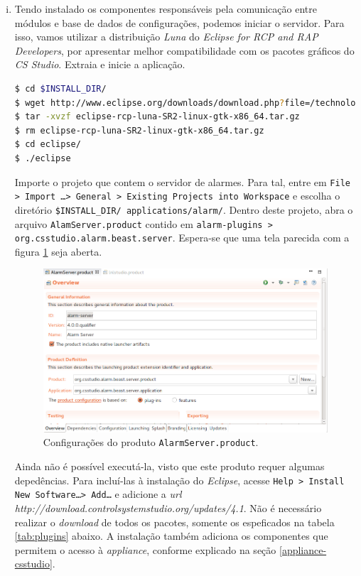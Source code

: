 \begin{enumerate}[i.]
\item Tendo instalado os componentes responsáveis pela comunicação entre módulos
e base de dados de configurações, podemos iniciar o servidor. Para isso, vamos
utilizar a distribuição \textit{Luna} do \textit{Eclipse for RCP and RAP
Developers}, por apresentar melhor compatibilidade com os pacotes gráficos do
\textit{CS Studio}. Extraia e inicie a aplicação.

\begin{lstlisting}[language=bash, style=nonumbers]
$ cd $INSTALL_DIR/
$ wget http://www.eclipse.org/downloads/download.php?file=/technology/epp/downloads/release/luna/SR2/eclipse-rcp-luna-SR2-linux-gtk-x86_64.tar.gz
$ tar -xvzf eclipse-rcp-luna-SR2-linux-gtk-x86_64.tar.gz
$ rm eclipse-rcp-luna-SR2-linux-gtk-x86_64.tar.gz
$ cd eclipse/
$ ./eclipse
\end{lstlisting}

Importe o projeto que contem o servidor de alarmes. Para tal, entre em
\texttt{File > Import \ldots > General > Existing Projects into Workspace} e
escolha o diretório \texttt{\$INSTALL\_DIR/ applications/alarm/}. Dentro deste
projeto, abra o arquivo \texttt{AlamServer.product} contido em
\texttt{alarm-plugins > org.csstudio.alarm.beast.server}. Espera-se que uma tela
parecida com a figura \ref{img:product-view} seja aberta.

\FloatBarrier

\begin{figure}[h]

\centering
\includegraphics[scale=0.45]{image/product-view}
\caption {Configurações do produto \texttt{AlarmServer.product}.}
\label{img:product-view} 
\end{figure}

\FloatBarrier

Ainda não é possível executá-la, visto que este produto requer algumas
depedências. Para incluí-las à instalação do \textit{Eclipse}, acesse
\texttt{Help > Install New Software\ldots > Add\ldots} e adicione a \textit{url}
\textit{http://download.controlsystemstudio.org/updates/4.1}. Não é necessário
realizar o \textit{download} de todos os pacotes, somente os espeficados na
tabela \ref{tab:plugins} abaixo. A instalação também adiciona os componentes que
permitem o acesso à \textit{appliance}, conforme explicado na seção
\ref{appliance-csstudio}. 


\end{enumerate}

